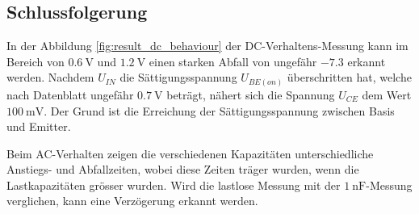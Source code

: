 \documentclass[../main.tex]{subfiles}
\begin{document}
\subsection{Schlussfolgerung}

In der Abbildung \ref{fig:result_dc_behaviour} der DC-Verhaltens-Messung kann im Bereich von $\SI{0.6}{\volt}$ und $\SI{1.2}{\volt}$ einen starken Abfall von ungefähr $-7.3$ erkannt werden. Nachdem $U_{IN}$ die Sättigungsspannung $U_{BE(on)}$ überschritten hat, welche nach Datenblatt ungefähr $\SI{0.7}{\volt}$ beträgt, nähert sich die Spannung $U_{CE}$ dem Wert $\SI{100}{\milli\volt}$. Der Grund ist die Erreichung der Sättigungsspannung zwischen Basis und Emitter.

Beim AC-Verhalten zeigen die verschiedenen Kapazitäten unterschiedliche Anstiegs- und Abfallzeiten, wobei diese Zeiten träger wurden, wenn die Lastkapazitäten grösser wurden. Wird die lastlose Messung mit der $\SI{1}{\nano\farad}$-Messung verglichen, kann eine Verzögerung erkannt werden.
\end{document}

